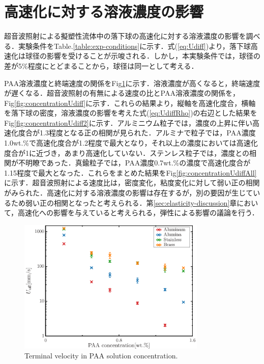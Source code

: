 \section{高速化に対する溶液濃度の影響}
\label{sec:concentration}
超音波照射による擬塑性流体中の落下球の高速化に対する溶液濃度の影響を調べる．実験条件をTable.\ref{table:exp-conditions}に示す．式(\ref{eq:Udiff})より，落下球高速化は球径の影響を受けることが示唆される．しかし，本実験条件では，球径の差が5\%程度にとどまることから，球径は同一として考える．

PAA溶液濃度と終端速度の関係をFig\ref{fig:concentrationUT}に示す．溶液濃度が高くなると，終端速度が遅くなる．超音波照射の有無による速度の比とPAA溶液濃度の関係を，Fig\ref{fig:concentrationUdiff}に示す．これらの結果より，縦軸を高速化度合，横軸を落下球の密度，溶液濃度の影響を考えた式(\ref{eq:UdiffRho})の右辺とした結果をFig\ref{fig:concentrationUdiff2}に示す．アルミニウム粒子では，濃度の上昇に伴い高速化度合が1.3程度となる正の相関が見られた．アルミナで粒子では，PAA濃度1.0wt.\%で高速化度合が1.2程度で最大となり，それ以上の濃度においては高速化度合が1に近づき，あまり高速化していない．ステンレス粒子では，濃度との相関が不明瞭であった．真鍮粒子では，PAA濃度0.7wt.\%の濃度で高速化度合が1.15程度で最大となった．これらをまとめた結果をFig\ref{fig:concentrationUdiffAll}に示す．超音波照射による速度比は，密度変化，粘度変化に対して弱い正の相関がみられた．高速化に対する溶液濃度の影響は存在するが，別の要因が生じているため弱い正の相関となったと考えられる．第\ref{sec:elasticity-discussion}章において，高速化への影響を与えていると考えられる，弾性による影響の議論を行う．

\begin{figure}[ht]
    \centering
    \includegraphics[width=0.8\textwidth]{./5-Results/concentrationUT.eps}
    \caption{Terminal velocity in PAA solution concentration.}
    \label{fig:concentrationUT}
\end{figure}

